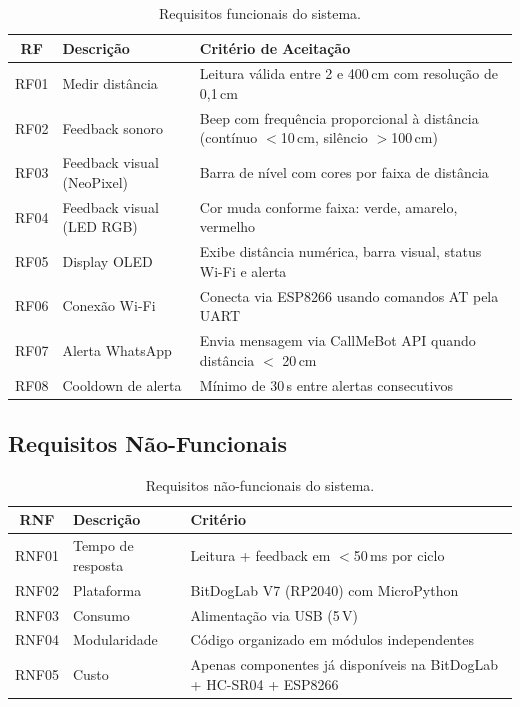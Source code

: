 \documentclass[12pt, a4paper]{article}
\begin{document}
\begin{table}[H]
\centering
\caption{Requisitos funcionais do sistema.}
\begin{tabular}{clp{8cm}}
  \toprule
  \textbf{RF} & \textbf{Descrição} & \textbf{Critério de Aceitação} \\
  \midrule
  RF01 & Medir distância & Leitura válida entre 2 e 400\,cm com resolução de 0,1\,cm \\
  RF02 & Feedback sonoro & Beep com frequência proporcional à distância (contínuo $<$10\,cm, silêncio $>$100\,cm) \\
  RF03 & Feedback visual (NeoPixel) & Barra de nível com cores por faixa de distância \\
  RF04 & Feedback visual (LED RGB) & Cor muda conforme faixa: verde, amarelo, vermelho \\
  RF05 & Display OLED & Exibe distância numérica, barra visual, status Wi-Fi e alerta \\
  RF06 & Conexão Wi-Fi & Conecta via ESP8266 usando comandos AT pela UART \\
  RF07 & Alerta WhatsApp & Envia mensagem via CallMeBot API quando distância $<$ 20\,cm \\
  RF08 & Cooldown de alerta & Mínimo de 30\,s entre alertas consecutivos \\
  \bottomrule
\end{tabular}
\end{table}

\subsection{Requisitos Não-Funcionais}

\begin{table}[H]
\centering
\caption{Requisitos não-funcionais do sistema.}
\begin{tabular}{clp{8cm}}
  \toprule
  \textbf{RNF} & \textbf{Descrição} & \textbf{Critério} \\
  \midrule
  RNF01 & Tempo de resposta & Leitura + feedback em $<$50\,ms por ciclo \\
  RNF02 & Plataforma & BitDogLab V7 (RP2040) com MicroPython \\
  RNF03 & Consumo & Alimentação via USB (5\,V) \\
  RNF04 & Modularidade & Código organizado em módulos independentes \\
  RNF05 & Custo & Apenas componentes já disponíveis na BitDogLab + HC-SR04 + ESP8266 \\
  \bottomrule
\end{tabular}
\end{table}
\end{document}
